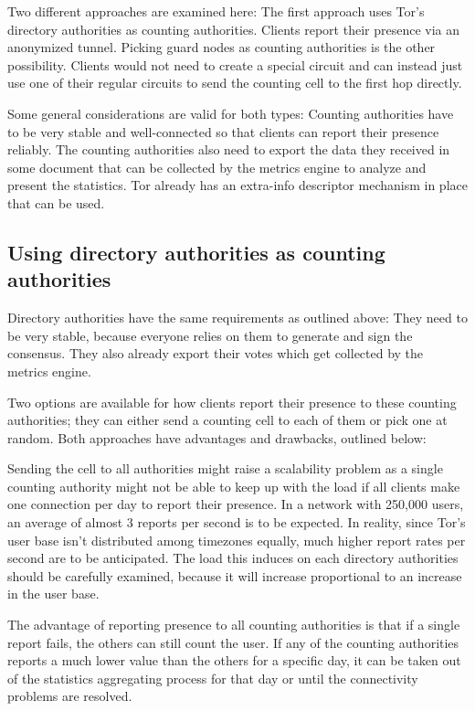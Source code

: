 \documentclass{article}
\begin{document}
Two different approaches are examined here:
The first approach uses Tor's directory authorities as counting authorities.
Clients report their presence via an anonymized tunnel.
Picking guard nodes as counting authorities is the other possibility.
Clients would not need to create a special circuit and can instead just use
one of their regular circuits to send the counting cell to the first hop directly.

Some general considerations are valid for both types:
Counting authorities have to be very stable and well-connected so that
clients can report their presence reliably.
The counting authorities also need to export the data they received in
some document that can be collected by the metrics engine to analyze and
present the statistics.
Tor already has an extra-info descriptor mechanism in place that can be
used.

\subsection{Using directory authorities as counting authorities}
Directory authorities have the same requirements as outlined above:
They need to be very stable, because everyone relies on them to
generate and sign the consensus.
They also already export their votes which get collected by the metrics
engine.

Two options are available for how clients report their presence to these
counting authorities; they can either send a counting cell to each of
them or pick one at random.
Both approaches have advantages and drawbacks, outlined below:

Sending the cell to all authorities might raise a scalability
problem as a single counting authority might not be able to keep
up with the load if all clients make one connection per day to report
their presence.
In a network with 250,000 users, an average of almost 3 reports per
second is to be expected.
In reality, since Tor's user base isn't distributed among timezones
equally, much higher report rates per second are to be anticipated.
The load this induces on each directory authorities should be carefully
examined, because it will increase proportional to an increase in the
user base.

The advantage of reporting presence to all counting authorities is that
if a single report fails, the others can still count the user.
If any of the counting authorities reports a much lower value than
the others for a specific day, it can be taken out of the statistics
aggregating process for that day or until the connectivity problems
are resolved.
\end{document}
